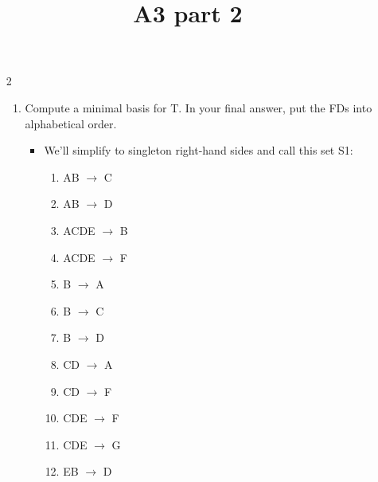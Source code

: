 \documentclass{article}
\title{A3 part 2}
\begin{document}
\renewcommand{\labelenumiii}{\arabic{enumiii}}
\begin{enumerate}

\item[2] %
\begin{enumerate}
\item %
Compute a minimal basis for T. In your final answer, put the FDs into alphabetical order.

\begin{itemize}
\item %
We'll simplify to singleton right-hand sides and call this set S1:
\begin{enumerate} 
\item AB $\rightarrow$ C
\item AB $\rightarrow$ D
\item ACDE $\rightarrow$ B
\item ACDE $\rightarrow$ F
\item B $\rightarrow$ A
\item B $\rightarrow$ C
\item B $\rightarrow$ D
\item CD $\rightarrow$ A
\item CD $\rightarrow$ F
\item CDE $\rightarrow$ F
\item CDE $\rightarrow$ G
\item EB $\rightarrow$ D
\end{enumerate}


\end{itemize}
\end{enumerate}
\end{enumerate}
\end{document}
